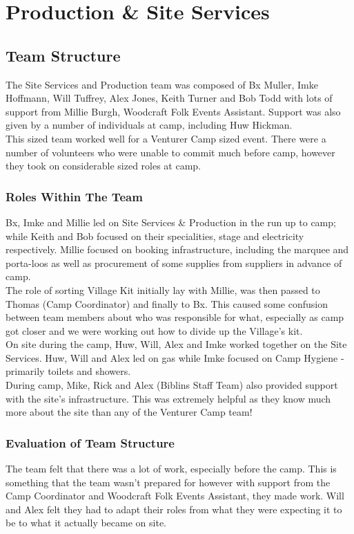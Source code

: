 \chapter{Production \& Site Services}
\section{Team Structure}
The Site Services and Production team was composed of Bx Muller, Imke Hoffmann, Will Tuffrey, Alex Jones, Keith Turner and Bob Todd with lots of support from Millie Burgh, Woodcraft Folk Events Assistant. Support was also given by a number of individuals at camp, including Huw Hickman. \\

This sized team worked well for a Venturer Camp sized event. There were a number of volunteers who were unable to commit much before camp, however they took on considerable sized roles at camp. 
\subsection{Roles Within The Team}
Bx, Imke and Millie led on Site Services \& Production in the run up to camp; while Keith and Bob focused on their specialities, stage and electricity respectively. Millie focused on booking infrastructure, including the marquee and porta-loos as well as procurement of some supplies from suppliers in advance of camp. \\

The role of sorting Village Kit initially lay with Millie, was then passed to Thomas (Camp Coordinator) and finally to Bx. This caused some confusion between team members about who was responsible for what, especially as camp got closer and we were working out how to divide up the Village's kit. \\

On site during the camp, Huw, Will, Alex and Imke worked together on the Site Services. Huw, Will and Alex led on gas while Imke focused on Camp Hygiene - primarily toilets and showers.  \\

During camp, Mike, Rick and Alex (Biblins Staff Team) also provided support with the site's infrastructure. This was extremely helpful as they know much more about the site than any of the Venturer Camp team!
\subsection{Evaluation of Team Structure}
The team felt that there was a lot of work, especially before the camp. This is something that the team wasn't prepared for however with support from the Camp Coordinator and Woodcraft Folk Events Assistant, they made work. Will and Alex felt they had to adapt their roles from what they were expecting it to be to what it actually became on site. \\

